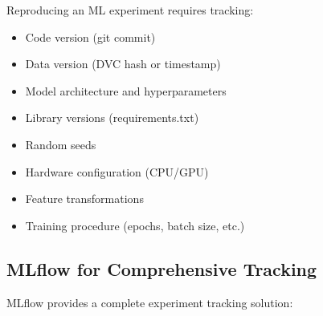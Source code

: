 Reproducing an ML experiment requires tracking:
\begin{itemize}
    \item Code version (git commit)
    \item Data version (DVC hash or timestamp)
    \item Model architecture and hyperparameters
    \item Library versions (requirements.txt)
    \item Random seeds
    \item Hardware configuration (CPU/GPU)
    \item Feature transformations
    \item Training procedure (epochs, batch size, etc.)
\end{itemize}

\subsection{MLflow for Comprehensive Tracking}

MLflow provides a complete experiment tracking solution:

